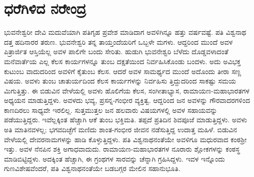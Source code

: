 
\chapter{ಧರೆಗಿಳಿದ ನರೇಂದ್ರ}

\noindent

ಭುವನೇಶ್ವರೀ ದೇವಿ ಮದುವೆಯಾಗಿ ಪತಿಗೃಹ ಪ್ರವೇಶ ಮಾಡಿದಾಗ ಅವಳಿಗಿನ್ನೂ ಹತ್ತು ವರ್ಷವಷ್ಟೆ. ಪತಿ ವಿಶ್ವನಾಥ ದತ್ತ ಹದಿನಾರರ ತರುಣ. ಭುವನೇಶ್ವರಿ ತನ್ನ ತಾಯ್ತಂದೆಯರಿಗೆ ಒಬ್ಬಳೇ ಮಗಳು. ಆದ್ದರಿಂದ ಮುಂದೆ ಅವಳ ಪಿತ್ರಾರ್ಜಿತ ಆಸ್ತಿಯೆಲ್ಲ ಅವಳ ಪಾಲಿಗೇ ಬಂದು ಸೇರಿತು. ಹುಡುಗಿ ಭುವನೇಶ್ವರಿ ಬೆಳೆದು ದೊಡ್ಡವಳಾದಂತೆ ಮನೆವಾರ್ತೆಯ ಎಲ್ಲ ಕೆಲಸ ಕಾರ್ಯಗಳನ್ನೂ ತುಂಬ ದಕ್ಷತೆಯಿಂದ ನಿರ್ವಹಿಸಿಕೊಂಡು ಬಂದಳು. ಅದು ಅವಿಭಕ್ತ ಕುಟುಂಬ ವಾದುದರಿಂದ ಅವಳಿಗೆ ಕೈತುಂಬ ಕೆಲಸ. ಆದರೆ ಅವಳ ಸಾಮರ್ಥ್ಯದ ಮುಂದೆ ಅದೊಂದು ತೀರಾ ಸಣ್ಣ ವಿಷಯ. ಅವಳು ತುಂಬ ಚಾತುರ್ಯದಿಂದ ಕೆಲಸ ಕಾರ್ಯಗಳನ್ನು ನಿರ್ವಹಿಸು ತ್ತಿದ್ದುದರಿಂದ ಸಾಕಷ್ಟು ಸಮಯ ಮಿಗುತ್ತಿತ್ತು. ಈ ಬಿಡುವಿನ ವೇಳೆಯಲ್ಲಿ ಅವಳು ಹೊಲಿಗೆಯ ಕೆಲಸ, ಸಂಗೀತಾಭ್ಯಾಸ, ರಾಮಾಯಣ-ಮಹಾಭಾರತಗಳ ಅಧ್ಯಯನ ಮಾಡುತ್ತಿದ್ದಳು. ಅವಳದು ಭವ್ಯ, ಪ್ರಸನ್ನ-ಗಂಭೀರ ವ್ಯಕ್ತಿತ್ವ. ಆದ್ದರಿಂದ ಜನ ಅವಳನ್ನು ಗೌರವಾದರಗಳಿಂದ ಕಾಣದಿರಲು ಸಾಧ್ಯವೇ ಇರಲಿಲ್ಲ. ಸುತ್ತಮುತ್ತಲ ಜನ ಹಲವಾರು ವಿಷಯಗಳಲ್ಲಿ ಅವಳ ಸಹಾಯವನ್ನು ಪಡೆಯುತ್ತಿದ್ದರು. ಇವೆಲ್ಲಕ್ಕಿಂತ ಹೆಚ್ಚಾಗಿ ಆಕೆ ತುಂಬ ಭಕ್ತಿಮತಿ. ತಪ್ಪದೆ ಪ್ರತಿದಿನ ಶಿವಪೂಜೆ ಮಾಡುತ್ತಿದ್ದಳು. ಅವಳು ಅತಿ ಮಾತಿನವಳಲ್ಲ; ಭಗವದಿಚ್ಛೆಗೆ ಮಣಿದು ಶಾಂತ-ಗಂಭೀರ ಜೀವನ ನಡೆಸುತ್ತಿದ್ದ ಉದಾತ್ತ ಮಹಿಳೆ. ಬಿಡುವಿನ ವೇಳೆಯಲ್ಲಿ ದೇವರನಾಮಗಳನ್ನು ಹಾಡಿ ಕೊಳ್ಳುತ್ತಿದ್ದಳು. ಪತಿ ವಿಶ್ವನಾಥನಂತೆಯೇ ಅವಳಿಗೂ ಮಧುರವಾದ ಕಂಠಶ್ರೀ ಇತ್ತು. ಅವಳ ನೆನಪಿನ ಶಕ್ತಿ ಅಗಾಧವಾದುದು. ರಾಮಾಯಣ-ಮಹಾಭಾರತಗಳ ನೂರಾರು ಶ್ಲೋಕಗಳನ್ನು ಕಂಠಸ್ಥ ಮಾಡಿಬಿಟ್ಟಿದ್ದಳು. ಅದಕ್ಕಿಂತ ಹೆಚ್ಚಾಗಿ, ಈ ಗ್ರಂಥಗಳ ಸಾರವನ್ನು ಚೆನ್ನಾಗಿ ಗ್ರಹಿಸಿದ್ದಳು. ಇವಳ ಇನ್ನೊಂದು ಗುಣವಿಶೇಷವೆಂದರೆ, ಪತಿ ವಿಶ್ವನಾಥನಂತೆಯೇ ಬಡಬಗ್ಗರ ಮೇಲಿನ ಸಹಾನುಭೂತಿ.

